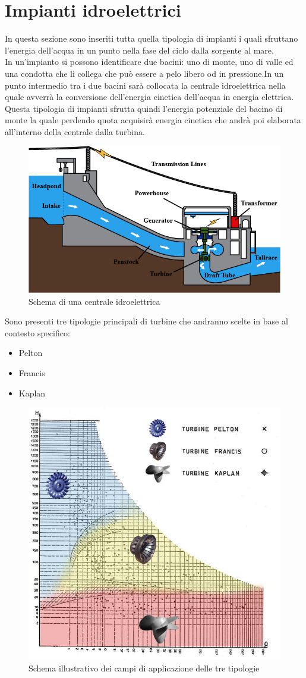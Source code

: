 \section{Impianti idroelettrici}
In questa sezione sono inseriti tutta quella tipologia di impianti i quali sfruttano l'energia dell'acqua in un punto nella fase del ciclo dalla sorgente al mare.\\
In un'impianto si possono identificare due bacini: uno di monte, uno di valle ed una condotta che li collega che può essere a pelo libero od in pressione.In un punto intermedio tra i due bacini sarà collocata la centrale idroelettrica nella quale avverrà la conversione dell'energia cinetica dell'acqua in energia elettrica.\\
Questa tipologia di impianti sfrutta quindi l'energia potenziale del bacino di monte la quale perdendo quota acquisirà energia cinetica che andrà poi elaborata all'interno della centrale dalla turbina.\\
\begin{figure}[H]
    \centering
    \includegraphics[height=0.4\textwidth]{res/cap 3/hpp diagram}
    \caption{Schema di una centrale idroelettrica}
\end{figure}\noindent
Sono presenti tre tipologie principali di turbine che andranno scelte in base al contesto specifico:
\begin{itemize}
    \item Pelton
    \item Francis
    \item Kaplan
\end{itemize}
\vfill
\newpage
\begin{figure}[H]
    \centering
    \includegraphics[height=0.4\textwidth]{res/cap 3/1_Campi-applicazione}
    \caption{Schema illustrativo dei campi di applicazione delle tre tipologie}
\end{figure}\noindent

